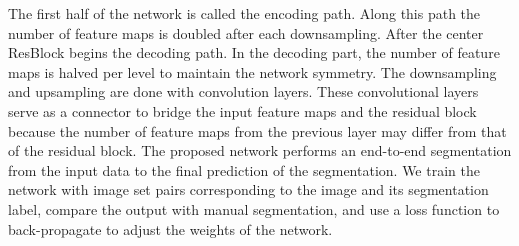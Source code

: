 The first half of the network is called the encoding path. Along this path the number of feature maps is doubled after each downsampling. After the center ResBlock begins the decoding path. In the decoding part, the number of feature maps is halved per level to maintain the network symmetry. The downsampling and upsampling are done with convolution layers. These convolutional layers serve as a connector to bridge the input feature maps and the residual block because the number of feature maps from the previous layer may differ from that of the residual block. The proposed network performs an end-to-end segmentation from the input data to the final prediction of the segmentation. We train the network with image set pairs corresponding to the image and its segmentation label, compare the output with manual segmentation, and use a loss function to back-propagate to adjust the weights of the network.

